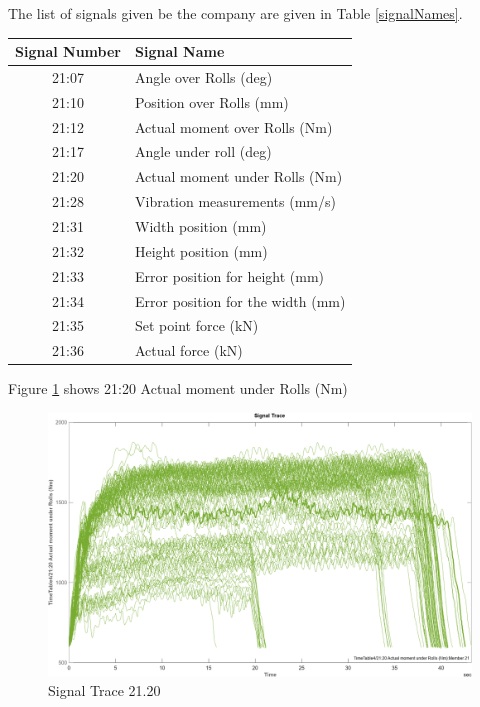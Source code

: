 \documentclass{article}
\begin{document}
The list of signals given be the company are given in Table \ref{signalNames}.
\begin{center}
\begin{tabular}{ |c|l| }
 \hline
 Signal Number & Signal Name \\ 
 \hline
21:07 & Angle over Rolls (deg) \\
 \hline
21:10 & Position over Rolls (mm) \\
 \hline
21:12 & Actual moment over Rolls (Nm) \\
 \hline
21:17 & Angle under roll (deg) \\
 \hline
21:20 & Actual moment under Rolls (Nm) \\
 \hline
21:28 & Vibration measurements (mm/s) \\ 
 \hline              
21:31 & Width position (mm) \\
 \hline
21:32 & Height position (mm) \\
 \hline
21:33 & Error position for height (mm) \\
 \hline
21:34 & Error position for the width (mm) \\
 \hline
21:35 & Set point force (kN) \\
 \hline
21:36 & Actual force (kN) \\
 \hline
\end{tabular}
\label{signalNames}
\end{center}

Figure \ref{fig:SignalTrace21.20} shows 21:20 Actual moment under Rolls (Nm)
\begin{figure}[H]
    \centering
    \includegraphics[width=\textwidth, height=\textheight, keepaspectratio]{figures/SignalTrace21.20.png}
    \caption{Signal Trace 21.20}
    \label{fig:SignalTrace21.20}
\end{figure}
\end{document}
